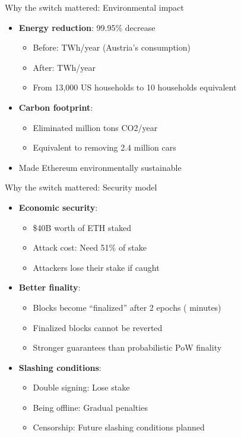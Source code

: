 \documentclass[aspectratio=169, lualatex, handout]{beamer}
\begin{document}
\begin{frame}{Why the switch mattered: Environmental impact}
	\begin{itemize}
		\item \textbf{Energy reduction}: 99.95\% decrease
		      \begin{itemize}
			      \item Before:  TWh/year (Austria's consumption)
			      \item After:  TWh/year
			      \item From 13,000 US households to 10 households equivalent
		      \end{itemize}
		\item \textbf{Carbon footprint}:
		      \begin{itemize}
			      \item Eliminated  million tons CO2/year
			      \item Equivalent to removing 2.4 million cars
		      \end{itemize}
		\item Made Ethereum environmentally sustainable
	\end{itemize}
\end{frame}

\begin{frame}{Why the switch mattered: Security model}
	\begin{itemize}
		\item \textbf{Economic security}:
		      \begin{itemize}
			      \item \approx\$40B worth of ETH staked
			      \item Attack cost: Need 51\% of stake
			      \item Attackers lose their stake if caught
		      \end{itemize}
		\item \textbf{Better finality}:
		      \begin{itemize}
			      \item Blocks become ``finalized'' after 2 epochs ( minutes)
			      \item Finalized blocks cannot be reverted
			      \item Stronger guarantees than probabilistic PoW finality
		      \end{itemize}
		\item \textbf{Slashing conditions}:
		      \begin{itemize}
			      \item Double signing: Lose stake
			      \item Being offline: Gradual penalties
			      \item Censorship: Future slashing conditions planned
		      \end{itemize}
	\end{itemize}
\end{frame}
\end{document}
